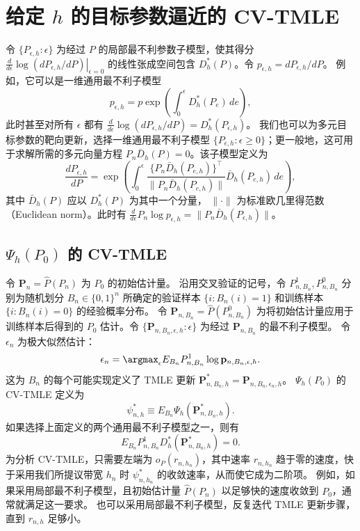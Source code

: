 \section{给定 \texorpdfstring{$h$}{h} 的目标参数逼近的 CV-TMLE}

令 $\{P_{\epsilon,h}:\epsilon\}$ 为经过 $P$ 的局部最不利参数子模型，使其得分
$\left.\frac{d}{d\epsilon}\log(dP_{\epsilon,h}/dP)\right|_{\epsilon=0}$
的线性张成空间包含 $D_h^*(P)$。令
$p_{\epsilon,h}=dP_{\epsilon,h}/dP$。
例如，它可以是一维通用最不利子模型
\[
 p_{\epsilon,h}=p\exp\left(\int_0^\epsilon D_h^*(P_e)\,de\right),
\]
此时甚至对所有 $\epsilon$ 都有
$\frac{d}{d\epsilon}\log(dP_{\epsilon,h}/dP)=D_h^*(P_{\epsilon,h})$。
我们也可以为多元目标参数的靶向更新，选择一维通用最不利子模型
$\{P_{\epsilon,h}:\epsilon\geq0\}$；更一般地，这可用于求解所需的多元向量方程
$P_n\bar D_h(P)=0$。该子模型定义为
\[
 \frac{dP_{\epsilon,h}}{dP}
 =\exp\left(
 \int_0^\epsilon
 \frac{\{P_n\bar D_h(P_{e,h})\}^{\top}}
      {\|P_n\bar D_h(P_{e,h})\|}
 \bar D_h(P_{e,h})\,de\right),
\]
其中 $\bar D_h(P)$ 应以 $D_h^*(P)$ 为其中一个分量，
$\|\cdot\|$ 为标准欧几里得范数（Euclidean norm）。此时有
$\frac{d}{d\epsilon}P_n\log p_{\epsilon,h}
=\|P_n\bar D_h(P_{\epsilon,h})\|$。

\subsection{\texorpdfstring{$\Psi_h(P_0)$}{Ψh(P0)} 的 CV-TMLE}

令 $\mathbf P_n=\hat P(P_n)$ 为 $P_0$ 的初始估计量。
沿用交叉验证的记号，令 $P^1_{n,B_n},P^0_{n,B_n}$ 分别为随机划分
$B_n\in\{0,1\}^n$ 所确定的验证样本 $\{i:B_n(i)=1\}$ 和训练样本
$\{i:B_n(i)=0\}$ 的经验概率分布。
令 $\mathbf P_{n,B_n}=\hat P(P^0_{n,B_n})$ 为将初始估计量应用于训练样本后得到的 $P_0$ 估计。令
$\{\mathbf P_{n,B_n,\epsilon,h}:\epsilon\}$ 为经过 $\mathbf P_{n,B_n}$ 的最不利子模型。
令 $\epsilon_n$ 为极大似然估计：
\[
 \epsilon_n=\argmax_\epsilon E_{B_n}P^1_{n,B_n}
 \log\mathbf p_{n,B_n,\epsilon,h}.
\]
这为 $B_n$ 的每个可能实现定义了 TMLE 更新
$\mathbf P^*_{n,B_n,h}=\mathbf P_{n,B_n,\epsilon_n,h}$。
$\Psi_h(P_0)$ 的 CV-TMLE 定义为
\[
 \psi^*_{n,h}\equiv E_{B_n}\Psi_h(\mathbf P^*_{n,B_n,h}).
\]
如果选择上面定义的两个通用最不利子模型之一，则有
\[
 E_{B_n}P^1_{n,B_n}D_h^*(\mathbf P^*_{n,B_n,h})=0.
\]
为分析 CV-TMLE，只需要左端为 $o_P(r_{n,h_n})$，其中速率
$r_{n,h_n}$ 趋于零的速度，快于采用我们所提议带宽 $h_n$ 时
$\psi^*_{n,h_n}$ 的收敛速率，从而使它成为二阶项。
例如，如果采用局部最不利子模型，且初始估计量 $\hat P(P_n)$ 以足够快的速度收敛到 $P_0$，通常就满足这一要求。
也可以采用局部最不利子模型，反复迭代 TMLE 更新步骤，直到 $r_{n,h}$ 足够小。
